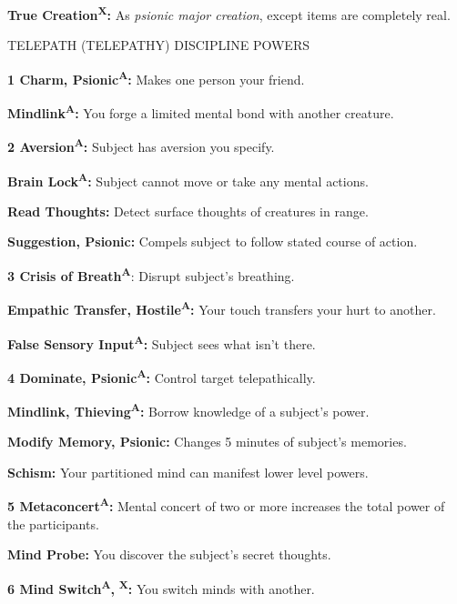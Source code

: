 \documentclass{article}
\begin{document}
\parindent=0pt
\textbf{True Creation}\textsuperscript{\textbf{X}}\textbf{:} As \textit{psionic 
major creation}, except items are completely real.

\vspace{12pt}
\parindent=-15pt
TELEPATH (TELEPATHY) DISCIPLINE POWERS

\textbf{1  Charm, Psionic}\textsuperscript{\textbf{A}}\textbf{:} Makes one person 
your friend.

\parindent=0pt
\textbf{Mindlink}\textsuperscript{\textbf{A}}\textbf{:} You forge a limited mental 
bond with another creature.

\parindent=-15pt
\textbf{2  Aversion}\textsuperscript{\textbf{A}}\textbf{:} Subject has aversion 
you specify.

\parindent=0pt
\textbf{Brain Lock}\textsuperscript{\textbf{A}}\textbf{:} Subject cannot move or 
take any mental actions.

\textbf{Read Thoughts:} Detect surface thoughts of creatures in range.

\textbf{Suggestion, Psionic:} Compels subject to follow stated course of action.

\parindent=-15pt
\textbf{3  Crisis of Breath}\textsuperscript{\textbf{A}}: Disrupt subject's breathing.

\parindent=0pt
\textbf{Empathic Transfer, Hostile}\textsuperscript{\textbf{A}}\textbf{:} Your 
touch transfers your hurt to another.

\textbf{False Sensory Input}\textsuperscript{\textbf{A}}\textbf{:} Subject sees 
what isn't there.

\parindent=-15pt
\textbf{4  Dominate, Psionic}\textsuperscript{\textbf{A}}\textbf{:} Control target 
telepathically.

\parindent=0pt
\textbf{Mindlink, Thieving}\textsuperscript{\textbf{A}}\textbf{:} Borrow knowledge 
of a subject's power.

\textbf{Modify Memory, Psionic:} Changes 5 minutes of subject's memories.

\textbf{Schism:} Your partitioned mind can manifest lower level powers.

\parindent=-15pt
\textbf{5 Metaconcert}\textsuperscript{\textbf{A}}\textbf{:} Mental concert of 
two or more increases the total power of the participants.

\parindent=0pt
\textbf{Mind Probe:} You discover the subject's secret thoughts.

\parindent=-15pt
\textbf{6  Mind Switch}\textsuperscript{\textbf{A}}{\scriptsize{}\textbf{, }}\textsuperscript{\textbf{X}}\textbf{:} 
You switch minds with another.
\end{document}
